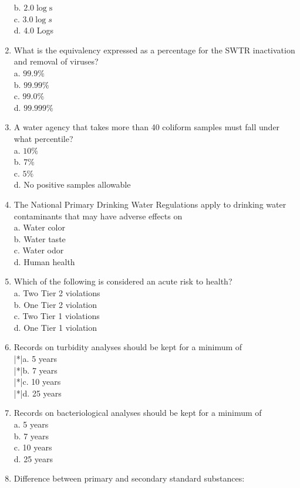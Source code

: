 \begin{enumerate}
b. $2.0 \log \mathrm{s}$\\
c. $3.0 \log s$\\
d. 4.0 Logs\\
\item What is the equivalency expressed as a percentage for the SWTR inactivation and removal of viruses?\\
a. $99.9 \%$\\
b. $99.99 \%$\\
c. $99.0 \%$\\
d. $99.999 \%$\\
\item A water agency that takes more than 40 coliform samples must fall under what percentile?\\
a. $10 \%$\\
b. $7 \%$\\
c. $5 \%$\\
d. No positive samples allowable\\
\item The National Primary Drinking Water Regulations apply to drinking water contaminants that may have adverse effects on\\
a. Water color\\
b. Water taste\\
c. Water odor\\
d. Human health\\
\item Which of the following is considered an acute risk to health?\\
a. Two Tier 2 violations\\
b. One Tier 2 violation\\
c. Two Tier 1 violations\\
d. One Tier 1 violation\\
\item Records on turbidity analyses should be kept for a minimum of\\
|*|a. 5 years\\
|*|b. 7 years\\
|*|c. 10 years\\
|*|d. 25 years\\
\item Records on bacteriological analyses should be kept for a minimum of\\
a. 5 years\\
b. 7 years\\
c. 10 years\\
d. 25 years\\
\item Difference between primary and secondary standard substances:\\

\end{enumerate}
